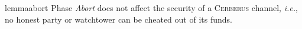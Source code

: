 \documentclass[runningheads]{llncs}
\newcommand{\ie}{{\em i.e.}}
\newcommand{\sys}{\textsc{Cerberus}\xspace}
\begin{document}
\vspace{-4pt}
\begin{restatable}{lemma}{abort}\label{lem:abort}
Phase \textit{Abort} does not affect the security of a \sys channel, \ie, no honest party or watchtower can be cheated out of its funds.
\end{restatable}
\end{document}
